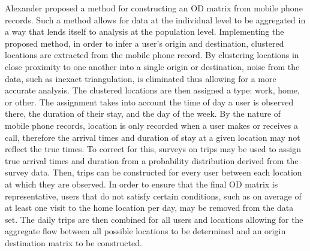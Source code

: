Alexander \et\cite{alexander_2015_origin} proposed a method for constructing an OD matrix from mobile phone records. Such a method allows for data at the individual level to be aggregated in a way that lends itself to analysis at the population level. Implementing the proposed method, in order to infer a user's origin and destination, clustered locations are extracted from the mobile phone record. By clustering locations in close proximity to one another into a single origin or destination, noise from the data, such as inexact triangulation, is eliminated thus allowing for a more accurate analysis. The clustered locations are then assigned a type: work, home, or other. The assignment takes into account the time of day a user is observed there, the duration of their stay, and the day of the week.
By the nature of mobile phone records, location is only recorded when a user makes or receives a call, therefore the arrival times and duration of stay at a given location may not reflect the true times. To correct for this, surveys on trips may be used to assign true arrival times and duration from a probability distribution derived from the survey data. Then, trips can be constructed for every user between each location at which they are observed. In order to ensure that the final OD matrix is representative, users that do not satisfy certain conditions, such as on average of at least one visit to the home location per day, may be removed from the data set. The daily trips are then combined for all users and locations allowing for the aggregate flow between all possible locations to be determined and an origin destination matrix to be constructed.

